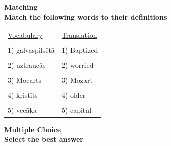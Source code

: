 \documentclass[a4paper]{article}
\begin{document}
\pagebreak
\Large \textbf{Matching} \\
\vspace{5mm}
\normalsize \textbf{ Match the following words to their definitions}
\begin{table}[!th]
\begin{tabularx}{\textwidth}{X X}
\underline{Vocabulary} & \underline{Translation} \\
& \\
1) galvaspilsētā & 1) Baptized \\
& \\
2) uztraucās & 2) worried \\
& \\
3) Mocarts & 3) Mozart \\
& \\
4) kristīts & 4) older\\
& \\
5) vecāka & 5) capital \\

\end{tabularx}
\end{table}


\Large \textbf{Multiple Choice} \\
\vspace{5mm}
\normalsize \textbf{Select the best answer} \\
\end{document}
